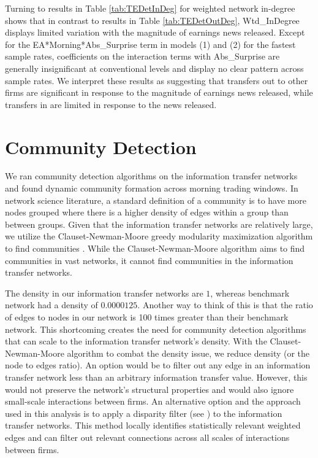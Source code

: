 Turning to results in Table \ref{tab:TEDetInDeg} for weighted network in-degree shows that in contrast to results in Table \ref{tab:TEDetOutDeg},  Wtd\_InDegree displays limited variation with the magnitude of earnings news released. Except for the EA*Morning*Abs\_Surprise term in models (1) and (2) for the fastest sample rates, coefficients on the interaction terms with Abs\_Surprise are generally insignificant at conventional levels and display no clear pattern across sample rates. We interpret these results as suggesting that transfers out to other firms are significant in response to the magnitude of earnings news released, while transfers in are limited in response to the news released.

\section{Community Detection}

We ran community detection algorithms on the information transfer networks and found dynamic community formation across morning trading windows.  In network science literature,  a standard definition of a community is to have more nodes grouped where there is a higher density of edges within a group than between groups.  Given that the information transfer networks are relatively large, we utilize the Clauset-Newman-Moore greedy modularity maximization algorithm to find communities \citep[see][]{Clauset2005}.  While the Clauset-Newman-Moore algorithm aims to find communities in vast networks, it cannot find communities in the information transfer networks. 

The density in our information transfer networks are \(1\), whereas \cite{Clauset2005} benchmark network had a density of \(0.0000125\). Another way to think of this is that the ratio of edges to nodes in our network is 100 times greater than their benchmark network. This shortcoming creates the need for community detection algorithms that can scale to the information transfer network's density.  With the Clauset-Newman-Moore algorithm to combat the density issue,  we reduce density (or the node to edges ratio).  An option would be to filter out any edge in an information transfer network less than an arbitrary information transfer value.  However, this would not preserve the network's structural properties and would also ignore small-scale interactions between firms.  An alternative option and the approach used in this analysis is to apply a disparity filter (see \cite{Serrano}) to the information transfer networks.  This method locally identifies statistically relevant weighted edges and can filter out relevant connections across all scales of interactions between firms.  

